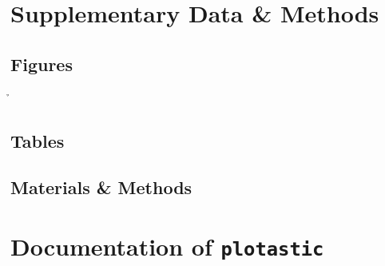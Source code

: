 \documentclass[12pt]{doctoral_thesis_uniwue}
\begin{document}
\begin{appendices}
    \pagestyle{appendix} %

    \section{Supplementary Data \& Methods}\label{apdx:supplemental}
    \resetcounters %

    \subsection{Figures}\label{subapdx:figs}
    \newpage
    ̉
    \newpage

    \subsection{Tables}\label{subapdx:tabs}
    \newpage
    
    \newpage

    \subsection{Materials \& Methods}\label{subapdx:methods}
    \newpage
    
    \newpage



    \section{Documentation of \texttt{plotastic}}\label{apdx:plotastic_docs}
    \resetcounters %

    
    \newpage


    
    \newpage

\end{appendices}




\end{document}
